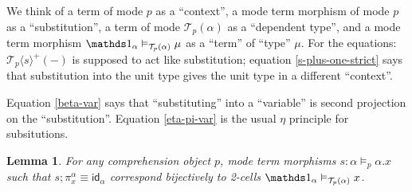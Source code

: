 \documentclass[10pt]{article}
\newtheorem{lemma}{Lemma}
\theoremstyle{definition}
\newcommand{\Yields}{\vDash}
\newcommand{\id}{\mathsf{id}}
\newcommand\TrPlus[2]{\ensuremath{{#1}^+(#2)}}
\newcommand\El[2]{\mathcal{T}_{#1}(#2)}
\newcommand\ApEl[2]{\mathcal{T}_{#1}\langle#2\rangle}
\begin{document}
We think of a term of mode $p$ as a ``context'', a mode term morphism of
mode $p$ as a ``substitution'', a term of mode $\El{p}{\alpha}$ as a
``dependent type'', and a mode term morphism $\One_\alpha
\Yields_{\El{p}{\alpha}} \mu$ as a ``term'' of ``type'' $\mu$.  For the
equations: $\TrPlus{\ApEl{p}{s}}{-}$ is supposed to act like
substitution; equation \eqref{s-plus-one-strict} says that substitution
into the unit type gives the unit type in a different ``context''.

Equation \eqref{beta-var} says that ``substituting'' into a ``variable'' is second projection on the ``substitution''.  Equation \eqref{eta-pi-var} is the usual $\eta$ principle for subsitutions.

\begin{lemma}\label{sigma:total-to-fiber0} 
For any comprehension object $p$, mode term morphisms $s : \alpha \vDash_p \alpha.x$ such that $s;\pi^\alpha_x \equiv \id_\alpha$ correspond bijectively to 2-cells $\One_\alpha \vDash_{\El{p}{\alpha}} x$.
\end{lemma}
\end{document}
